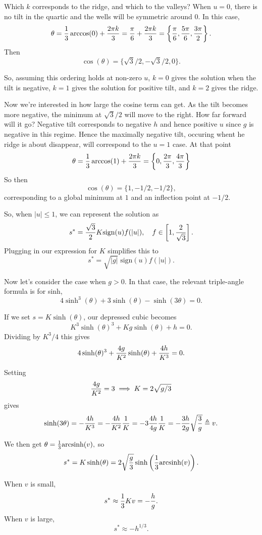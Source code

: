 \documentclass[10pt]{article}
\begin{document}
Which $k$ corresponds to the ridge, and which to the valleys? When $u = 0$, there is no tilt in the quartic and the wells will be symmetric around 0. In this case, $$ \theta = {1 \over 3} \arccos(0) + {2 \pi k \over 3} = {\pi \over 6} + {2 \pi k \over 3} = \left\{ {\pi \over 6}, {5 \pi \over 6}, {3 \pi \over 2} \right \}.$$
Then $$\cos(\theta) = \{\sqrt{3}/2, -\sqrt{3}/2, 0\}.$$

So, assuming this ordering holds at non-zero $u$, $k = 0$ gives the solution when the tilt is negative, $k =1$ gives the solution for positive tilt, and $k = 2$ gives the ridge.

Now we're interested in how large the cosine term can get. As the tilt becomes more negative, the minimum at $\sqrt{3}/2$ will move to the right. How far forward will it go? Negative tilt corresponds to negative $h$ and hence positive $u$ since $g$ is negative in this regime. Hence the maximally negative tilt, occuring whent he ridge is about disappear, will correspond to the $u = 1$ case. At that point $$ \theta = {1 \over 3} \arccos(1) + {2 \pi k \over 3} = \left\{0,  {2 \pi \over 3},  {4 \pi \over 3} \right\}$$ So then $$ \cos(\theta) = \{1, -{1/2}, -{1/2}\},$$ corresponding to a global minimum at $1$ and an inflection point at $-1/2$.

So, when $|u| \le 1$, we can represent the solution as $$ s^* = { \sqrt{3} \over 2}  K  \text{sign}(u) f(|u|), \quad f \in \left[1, {2\over \sqrt{3}} \right].$$ Plugging in our expression for $K$ simplifies this to $$ s^* = \sqrt{|g|} \; \text{sign}(u) f(|u|).$$

Now let's consider the case when $g > 0$. In that case, the relevant triple-angle formula is for sinh, $$ 4 \sinh^3(\theta) + 3 \sinh(\theta) - \sinh(3 \theta) = 0.$$

If we set $s = K \sinh (\theta)$, our depressed cubic becomes $$ K^3 \sinh(\theta)^3 + K g \sinh(\theta) + h = 0.$$
Dividing by $K^3/4$ this gives $$ 4 \sinh(\theta)^3 + {4 g \over K^2} \sinh(\theta) + {4h \over K^3} = 0.$$

Setting $$ {4g \over K^2} = 3 \implies K = 2 \sqrt{ g / 3}$$ gives $$  \sinh(3 \theta) = - {4 h \over K^3} = -{4 h \over K^2}{1 \over K} = -3 { 4 h \over 4 g} {1 \over K} = -{3h \over 2 g} \sqrt{3 \over g} \triangleq v.$$

We then get $\theta = {1 \over 3} \text{arcsinh}(v),$ so $$s^* = K \sinh(\theta) = 2\sqrt{g \over 3} \sinh\left({1 \over 3}\text{arcsinh}(v)\right).$$

When $v$ is small, $$s^* \approx {1\over 3}K v = -{h \over g}. $$ When $v$ is large, $$ s^* \approx -h^{1/3}.$$
\end{document}
